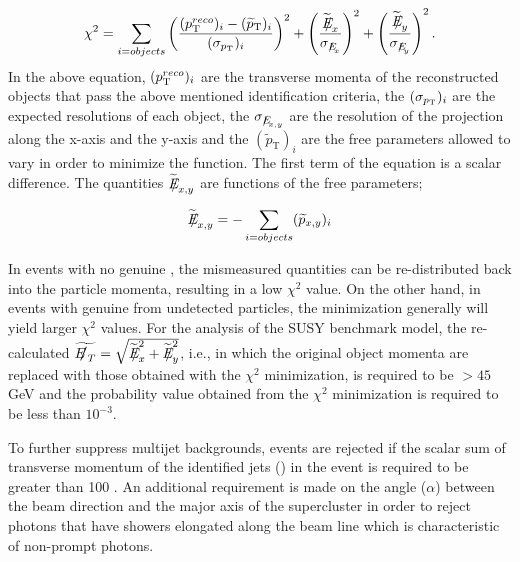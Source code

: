 \begin{equation}\label{eq:1ab}
   \chi^2 = \sum_{i=objects} \left( \frac{(\PT^{reco})_i-(\widetilde{p}_{\mathrm{T}})_i}{(\sigma_{\PT})_i} \right)^2 + \left( \frac{\widetilde{\Em}_x}{\sigma_{{\Em}_x}}\right)^2  + \left( \frac{\widetilde{\Em}_y}{\sigma_{{\Em}_y}}\right)^2.
\end{equation} 
In the above equation, $(p_{\mathrm{T}}^{reco})_{i}$ are the transverse  momenta of the reconstructed objects that pass the above mentioned identification criteria, the $(\sigma_{p_{\mathrm{T}}})_{i}$ are the expected resolutions of each object, the $\sigma_{{E\hspace{-0.6em}/}_{x,y}}$ are the resolution of the \met projection along the x-axis and the y-axis and the $(\widetilde{p}_{\mathrm T})_{i}$ are the free parameters allowed to vary in order to minimize the function. The first term of the equation is a scalar difference. The quantities $\widetilde{E\hspace{-0.6em}/}_{x,y}$ are functions of the free parameters;
  
\begin{eqnarray}
\widetilde{\Em}_{x,y} =  - \sum_{i=objects} (\widetilde{p}_{x,y})_i %
\end{eqnarray}

    In events with no genuine \met, the mismeasured quantities can be re-distributed back into the particle momenta, resulting in a low $\chi^{2}$ value. On the other hand, in events with genuine \met from undetected particles, the minimization generally will yield larger $\chi^{2}$ values. For the analysis of the SUSY benchmark model, the re-calculated $\widetilde{\met} = \sqrt{\widetilde{\Em}_{x}^2 + \widetilde{\Em}_{y}^2}$, i.e., in which the original object momenta are replaced with those obtained with the $\chi^{2}$ minimization, is required to be $ > 45$ GeV and the probability value obtained from the $\chi^{2}$ minimization is required to be less than $10^{-3}$. %

    To further suppress multijet backgrounds, events are rejected if the scalar sum of transverse momentum of the identified jets (\HT) in the event is required to be greater than 100 \GeV. An additional requirement is made on the angle ($\alpha$) between the beam direction and the major axis of the supercluster in order to reject photons that have showers elongated along the beam line which is characteristic of non-prompt photons. 

